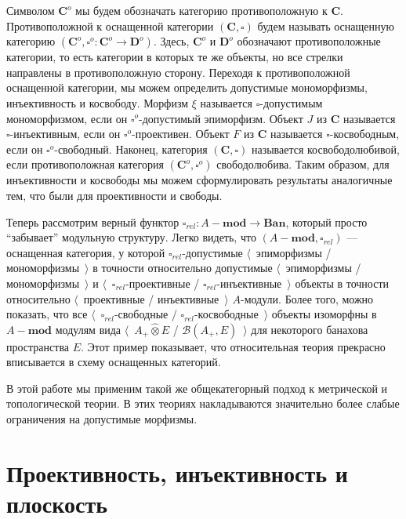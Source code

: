 \documentclass[12pt]{article}
\newcommand{\projtens}{\mathbin{\widehat{\otimes}}}
\begin{document}
Символом $\mathbf{C}^{o}$ мы будем обозначать категорию противоположную к
$\mathbf{C}$. Противоположной к оснащенной категории $(\mathbf{C}, \square)$
будем называть оснащенную категорию
$(\mathbf{C}^{o},\square^{o}:\mathbf{C}^{o}\to\mathbf{D}^{o})$. Здесь,
$\mathbf{C}^o$ и $\mathbf{D}^o$ обозначают противоположные категории, то есть
категории в которых  те же объекты, но все стрелки направлены в противоположную
сторону. Переходя к противоположной оснащенной категории, мы можем определить
допустимые мономорфизмы, инъективность и косвободу. Морфизм $\xi$ называется
$\square$-допустимым мономорфизмом, если он $\square^o$-допустимый эпиморфизм.
Объект $J$ из $\mathbf{C}$ называется $\square$-инъективным, если он
$\square^o$-проективен. Объект $F$ из $\mathbf{C}$ называется
$\square$-косвободным, если он $\square^o$-свободный. Наконец, категория
$(\mathbf{C}, \square)$ называется косвободолюбивой, если  противоположная
категория $(\mathbf{C}^{o},\square^{o})$ свободолюбива. Таким образом, для
инъективности и косвободы мы можем сформулировать результаты аналогичные тем,
что были для проективности и свободы.

Теперь рассмотрим верный функтор $\square_{rel}:A-\mathbf{mod}\to\mathbf{Ban}$,
который просто ``забывает'' модульную структуру. Легко видеть, что
$(A-\mathbf{mod},\square_{rel})$ --- оснащенная категория, у которой
$\square_{rel}$-допустимые $\langle$~эпиморфизмы / мономорфизмы~$\rangle$ в
точности относительно допустимые $\langle$~эпиморфизмы / мономорфизмы~$\rangle$
и $\langle$~$\square_{rel}$-проективные / $\square_{rel}$-инъективные~$\rangle$
объекты в точности относительно $\langle$~проективные / инъективные~$\rangle$
$A$-модули. Более того, можно показать, что все
$\langle$~$\square_{rel}$-свободные / $\square_{rel}$-косвободные~$\rangle$
объекты изоморфны в $A-\mathbf{mod}$ модулям вида $\langle$~$A_+\projtens E$ /
$\mathcal{B}(A_+,E)$~$\rangle$ для некоторого банахова пространства $E$. Этот
пример показывает, что относительная теория прекрасно вписывается в схему
оснащенных категорий.

В этой работе мы применим такой же общекатегорный подход к метрической и
топологической теории. В этих теориях накладываются значительно более слабые
ограничения на допустимые морфизмы.


\section{Проективность, инъективность и
  плоскость}\label{SectionProjectivityInjectivityAndFlatness}
\end{document}
